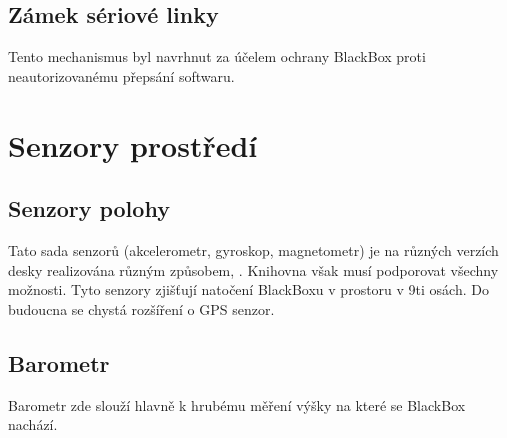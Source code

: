 \subsection{Zámek sériové linky}
Tento mechanismus byl navrhnut za účelem ochrany BlackBox proti neautorizovanému přepsání softwaru.

\section{Senzory prostředí}

\subsection{Senzory polohy}
Tato sada senzorů (akcelerometr, gyroskop, magnetometr) je na různých verzích desky realizována různým způsobem, .
Knihovna však musí podporovat všechny možnosti.
Tyto senzory zjišťují natočení BlackBoxu v prostoru v 9ti osách.
Do budoucna se chystá rozšíření o GPS senzor. 

\subsection{Barometr}
Barometr zde slouží hlavně k hrubému měření výšky na které se BlackBox nachází.